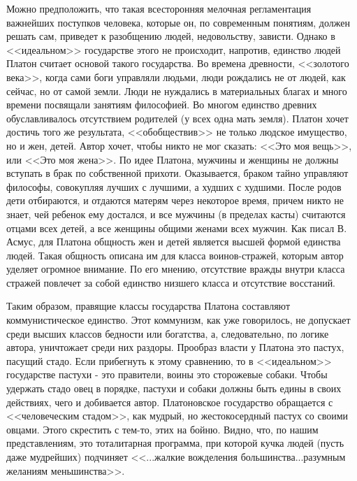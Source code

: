 	Можно предположить, что такая всесторонняя мелочная регламентация важнейших 
	поступков человека, которые он, по современным понятиям, должен решать сам, 
	приведет к разобщению людей, недовольству, зависти. Однако в <<идеальном>> 
	государстве этого не происходит, напротив, единство людей Платон считает 
	основой такого государства. Во времена древности, <<золотого века>>, когда 
	сами боги управляли людьми, люди рождались не от людей, как сейчас, но от 
	самой земли. Люди не нуждались в материальных благах и много времени 
	посвящали занятиям философией. Во многом единство древних обуславливалось 
	отсутствием родителей (у всех одна мать земля). Платон хочет достичь того 
	же результата, <<обобществив>> не только людское имущество, но и жен, детей. 
	Автор хочет, чтобы никто не мог сказать: <<Это моя вещь>>, или 
	<<Это моя жена>>. По идее Платона, мужчины и женщины не должны вступать в 
	брак по собственной прихоти. Оказывается, браком тайно управляют философы, 
	совокупляя лучших с лучшими, а худших с худшими. После родов дети 
	отбираются, и отдаются матерям через некоторое время, причем никто 
	не знает, чей ребенок ему достался, и все мужчины (в пределах касты) 
	считаются отцами всех детей, а все женщины общими женами всех мужчин. 
	Как писал В. Асмус, для Платона общность жен и детей является высшей 
	формой единства людей. Такая общность описана им для класса 
	воинов-стражей, которым автор уделяет огромное внимание. По его мнению, 
	отсутствие вражды внутри класса стражей повлечет за собой единство низшего 
	класса и отсутствие восстаний. 

	Таким образом, правящие классы государства Платона составляют 
	коммунистическое единство. Этот коммунизм, как уже говорилось, не 
	допускает среди высших классов бедности или богатства, а, следовательно, 
	по логике автора, уничтожает среди них раздоры. Прообраз власти у Платона 
	это пастух, пасущий стадо. Если прибегнуть к этому сравнению, то в 
	<<идеальном>> государстве пастухи - это правители, воины это сторожевые 
	собаки. Чтобы удержать стадо овец в порядке, пастухи и собаки должны быть 
	едины в своих действиях, чего и добивается автор. Платоновское государство 
	обращается с <<человеческим стадом>>, как мудрый, но жестокосердный пастух 
	со своими овцами. Этого скрестить с тем-то, этих на бойню. Видно, что, по 
	нашим представлениям, это тоталитарная программа, при которой кучка людей 
	(пусть даже мудрейших) подчиняет <<...жалкие вожделения большинства...разумным 
	желаниям меньшинства>>. 

